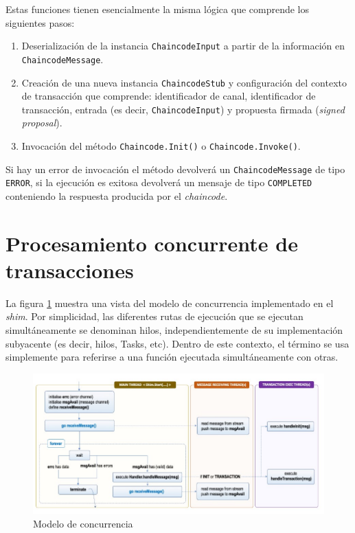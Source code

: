 Estas funciones tienen esencialmente la misma lógica que comprende los siguientes pasos:

\begin{enumerate}
\item Deserialización de la instancia \texttt{ChaincodeInput} a partir de la información en \texttt{ChaincodeMessage}.

\item Creación de una nueva instancia \texttt{ChaincodeStub} y configuración del contexto de transacción que comprende: identificador de canal, identificador de transacción, entrada (es decir, \texttt{ChaincodeInput}) y propuesta firmada (\textit{signed proposal}).

\item Invocación del método \texttt{Chaincode.Init()} o \texttt{Chaincode.Invoke()}.
\end{enumerate}

Si hay un error de invocación el método devolverá un \texttt{ChaincodeMessage} de tipo \texttt{ERROR}, si la ejecución es exitosa devolverá un mensaje de tipo \texttt{COMPLETED} conteniendo la respuesta producida por el \textit{chaincode}.



\section{Procesamiento concurrente de transacciones}\label{concurrencymodel}
La figura \ref{fig:concurrencyModel} muestra una vista del modelo de concurrencia implementado en el \textit{shim}. Por simplicidad, las diferentes rutas de ejecución que se ejecutan simultáneamente se denominan hilos, independientemente de su implementación subyacente (es decir, hilos, Tasks, etc). Dentro de este contexto, el término se usa simplemente para referirse a una función ejecutada simultáneamente con otras.

\begin{figure}[tbph]
\centering
\includegraphics[width=\textwidth]{Images/concurrency_model}
\caption{Modelo de concurrencia}
\label{fig:concurrencyModel}
\end{figure}

